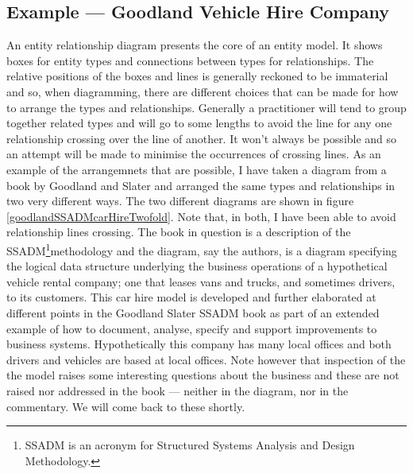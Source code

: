 \subsection{Example --- Goodland Vehicle Hire Company}
\label{GoodlandVehicleHireCompany}
\mynote
An entity relationship diagram presents the core of an entity model.
It shows boxes for entity types and connections between types for relationships.
\mynote
The relative positions of the boxes and lines is generally reckoned to be immaterial and so, 
when diagramming, there
are  different choices that can be made for how to arrange the types and relationships. 
Generally a practitioner will tend to group together related types and will 
 go to some lengths to avoid the line for any one relationship crossing over the line of another.
It won't always be possible and so an attempt will be made to minimise the occurrences of crossing lines.    
As an example of the arrangemnets that are possible, I have taken a diagram from a book by Goodland and Slater and arranged the same types and relationships in two very different ways. The two different diagrams are shown in figure \ref{goodlandSSADMcarHireTwofold}. 
Note that, in both, I have been able to avoid relationship lines crossing.
The book in question is a description of the SSADM\footnote{SSADM is an acronym for Structured Systems Analysis and Design Methodology.}methodology and
the diagram, say the authors, is a diagram specifying the logical data structure underlying the business operations of a hypothetical vehicle rental company; one that leases vans and trucks, and sometimes drivers, to its customers. 
\mynote
This car hire model is developed and further elaborated at different points in the Goodland Slater SSADM book as part of an extended example of how to document, analyse, specify and support improvements to business systems. 
\mynote 
Hypothetically this company has many local offices and both drivers and vehicles are based at local offices. 
Note however that inspection of the the model raises some interesting questions about the business 
and these are not raised nor addressed in the book ---
neither in the diagram, nor in the commentary. 
We will come back to these shortly.

